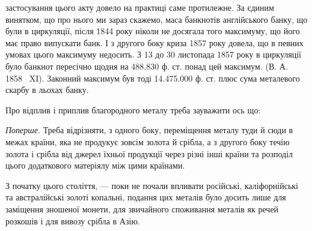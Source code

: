 \parcont{}  %
застосування цього акту довело на практиці саме протилежне. За єдиним винятком,
що про нього ми зараз скажемо, маса банкнотів англійського банку,
що були в циркуляції, після 1844 року ніколи не досягала того максимуму, що
його має право випускати банк. І з другого боку криза 1857 року довела, що
в певних умовах цього максимуму недосить. З 13 до 30 листопада 1857 року
в циркуляції було банкнот пересічно щодня на 488.830 ф. ст. понад цей
максимум. (В. А. 1858~ XI). Законний максимум був тоді 14.475.000 ф. ст.
плюс сума металевого скарбу в льохах банку.

Про відплив і приплив благородного металу треба зауважити ось що:

\emph{Поперше}. Треба відрізняти, з одного боку, переміщення металу туди
й сюди в межах країни, яка не продукує зовсім золота й срібла, а з другого
боку течію золота і срібла від джерел їхньої продукції через різні інші країни
та розподіл цього додаткового матеріялу між цими країнами.

З початку цього століття, — поки не почали впливати російські, каліфорнійські
та австралійські золоті копальні, подання цих металів було досить лише
для заміщення зношеної монети, для звичайного споживання металів як речей
розкошів і для вивозу срібла в Азію.

